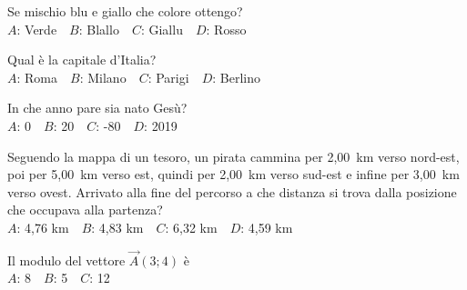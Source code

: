 \mcquestionfooter



\def\mcquestionnumber{2}


\mcquestionheader Se mischio blu e giallo che colore ottengo?\\
{$A$}: Verde\ \ {$B$}: Blallo\ \ {$C$}: Giallu\ \ {$D$}: Rosso\ \ 

\mcquestionfooter



\def\mcquestionnumber{3}


\mcquestionheader Qual è la capitale d’Italia?\\
{$A$}: Roma\ \ {$B$}: Milano\ \ {$C$}: Parigi\ \ {$D$}: Berlino\ \ 

\mcquestionfooter



\def\mcquestionnumber{4}


\mcquestionheader In che anno pare sia nato Gesù?\\
{$A$}: 0\ \ {$B$}: 20\ \ {$C$}: -80\ \ {$D$}: 2019\ \ 

\mcquestionfooter



\def\mcquestionnumber{5}


\mcquestionheader Seguendo la mappa di un tesoro, un pirata cammina per 2,00~km verso nord-est, poi per 5,00~km verso est, quindi per 2,00~km verso sud-est e infine per 3,00~km verso ovest. Arrivato alla fine del percorso a che distanza si trova dalla posizione che occupava alla partenza?\\
{$A$}: 4,76 km\ \ {$B$}: 4,83 km\ \ {$C$}: 6,32 km\ \ {$D$}: 4,59 km\ \ 

\mcquestionfooter



\def\mcquestionnumber{6}


\mcquestionheader Il modulo del vettore $\vec{A}(3;4)$ è\\
{$A$}: 8\ \ {$B$}: 5\ \ {$C$}: 12\ \ 

\mcquestionfooter



\def\mcquestionnumber{7}


